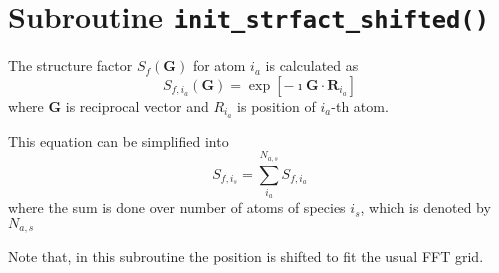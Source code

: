 \documentclass[a4paper,10pt,fleqn]{article}
\begin{document}
\section{Subroutine \texttt{init\_strfact\_shifted()}}

The structure factor $S_{f}(\mathbf{G})$ for atom $i_a$ is calculated as
\begin{equation}
S_{f,i_a}(\mathbf{G}) = \exp\left[ -\imath \mathbf{G}\cdot\mathbf{R}_{i_a}\right]
\label{eq:strfact}
\end{equation}
where $\mathbf{G}$ is reciprocal vector and $R_{i_a}$ is position of $i_a$-th atom.

This equation can be simplified into
\begin{equation}
S_{f,i_s} = \sum_{i_a}^{N_{a,s}} S_{f,i_a}
\end{equation}
where the sum is done over number of atoms of species $i_s$, which is denoted
by $N_{a,s}$

Note that, in this subroutine the position is shifted to fit the usual FFT grid.
\end{document}
